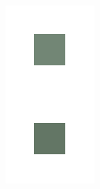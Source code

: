 \documentclass[journal,onecolumn]{IEEEtran}
\begin{document}
{\begin{figure}[H]
\begin{subfigure}[b]{0.2\textwidth}
            \includegraphics[width=.85\linewidth, frame]{test-crisp-3}
            \caption{}
    \end{subfigure}\\
    \begin{subfigure}[b]{0.2\textwidth}
            \centering

\end{subfigure}
\end{figure}}
\end{document}

